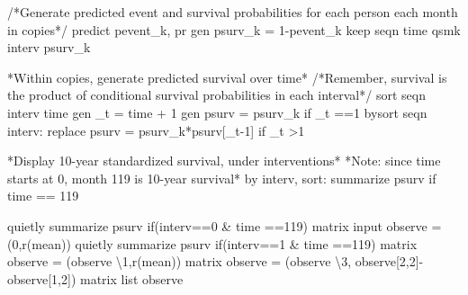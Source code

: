 \documentclass[
  10pt,
  a4paper,
]{book}
\newenvironment{Shaded}{\begin{snugshade}}{\end{snugshade}}
\newcommand{\BaseNTok}[1]{\textcolor[rgb]{0.68,0.00,0.00}{#1}}
\newcommand{\CommentTok}[1]{\textcolor[rgb]{0.37,0.37,0.37}{#1}}
\newcommand{\FunctionTok}[1]{\textcolor[rgb]{0.28,0.35,0.67}{#1}}
\newcommand{\KeywordTok}[1]{\textcolor[rgb]{0.00,0.46,0.62}{#1}}
\newcommand{\NormalTok}[1]{\textcolor[rgb]{0.00,0.46,0.62}{#1}}
\newcommand{\OtherTok}[1]{\textcolor[rgb]{0.00,0.46,0.62}{#1}}
\begin{document}
\begin{Shaded}
\begin{Highlighting}[]
\CommentTok{/*Generate predicted event and survival probabilities }
\CommentTok{for each person each month in copies*/}
\KeywordTok{predict}\NormalTok{ pevent\_k, pr}
\KeywordTok{gen}\NormalTok{ psurv\_k = 1{-}pevent\_k}
\KeywordTok{keep}\NormalTok{ seqn time qsmk interv psurv\_k }

\NormalTok{*Within copies, }\KeywordTok{generate}\NormalTok{ predicted survival }\BaseNTok{over}\NormalTok{ time*}
\CommentTok{/*Remember, survival is the product of conditional survival}
\CommentTok{probabilities in each interval*/}
\KeywordTok{sort}\NormalTok{ seqn interv time}
\KeywordTok{gen}\NormalTok{ \_t = time + 1}
\KeywordTok{gen}\NormalTok{ psurv = psurv\_k }\KeywordTok{if}\NormalTok{ \_t ==1       }
\KeywordTok{bysort}\NormalTok{ seqn interv: }\KeywordTok{replace}\NormalTok{ psurv = psurv\_k*psurv[\_t{-}1] }\KeywordTok{if}\NormalTok{ \_t \textgreater{}1 }

\NormalTok{*Display 10{-}}\FunctionTok{year}\NormalTok{ standardized survival, under interventions*}
\NormalTok{*Note: since time starts }\FunctionTok{at}\NormalTok{ 0, }\FunctionTok{month}\NormalTok{ 119 is 10{-}}\FunctionTok{year}\NormalTok{ survival*}
\KeywordTok{by}\NormalTok{ interv, }\KeywordTok{sort}\NormalTok{: }\KeywordTok{summarize}\NormalTok{ psurv }\KeywordTok{if}\NormalTok{ time == 119}

\KeywordTok{quietly} \KeywordTok{summarize}\NormalTok{ psurv }\KeywordTok{if}\NormalTok{(interv==0 \& time ==119)}
\FunctionTok{matrix}\NormalTok{ input observe = (0,}\OtherTok{\textasciigrave{}r(mean)\textquotesingle{}}\NormalTok{)}
\KeywordTok{quietly} \KeywordTok{summarize}\NormalTok{ psurv }\KeywordTok{if}\NormalTok{(interv==1 \& time ==119)}
\FunctionTok{matrix}\NormalTok{ observe = (observe \textbackslash{}1,}\OtherTok{\textasciigrave{}r(mean)\textquotesingle{}}\NormalTok{)}
\FunctionTok{matrix}\NormalTok{ observe = (observe \textbackslash{}3, observe[2,2]{-}observe[1,2]) }
\FunctionTok{matrix} \OtherTok{list}\NormalTok{ observe}


\end{Highlighting}
\end{Shaded}
\end{document}
